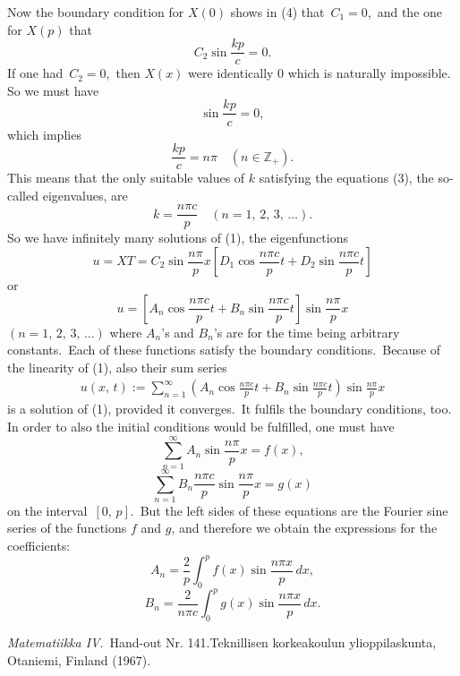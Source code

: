\documentclass[12pt]{article}
\theoremstyle{definition}
\begin{document}
Now the boundary condition for $X(0)$ shows in (4) that\, $C_1 = 0$,\, and the one for $X(p)$ that 
              $$C_2\sin\frac{kp}{c} = 0.$$
If one had\, $C_2 = 0$,\, then $X(x)$ were identically 0 which is naturally impossible.\, So we must have
               $$\sin\frac{kp}{c} = 0,$$
which implies
$$\frac{kp}{c} = n\pi \quad (n \in \mathbb{Z}_+).$$
This means that the only suitable values of $k$ satisfying the equations (3), the so-called eigenvalues, are
$$k = \frac{n\pi c}{p} \quad (n = 1,\,2,\,3,\,\ldots).$$
So we have infinitely many solutions of (1), the eigenfunctions
$$u = XT = C_2\sin\frac{n\pi}{p}x
\left[D_1\cos\frac{n\pi c}{p}t+D_2\sin\frac{n\pi c}{p}t\right]$$
or
$$u = \left[A_n\cos\frac{n\pi c}{p}t+B_n\sin\frac{n\pi c}{p}t\right]
\sin\frac{n\pi}{p}x$$
$(n = 1,\,2,\,3,\,\ldots)$ where $A_n$'s and $B_n$'s are for the time being arbitrary constants.\, Each of these functions satisfy the boundary conditions.\, Because of the linearity of (1), also their sum series 
\begin{align}
u(x,\,t) := \sum_{n=1}^\infty\left(A_n\cos\frac{n\pi c}{p}t+B_n\sin\frac{n\pi c}{p}t\right)\sin\frac{n\pi}{p}x
\end{align}
is a solution of (1), provided it converges.\, It fulfils the boundary conditions, too.\, In order to also the initial conditions would be fulfilled, one must have
$$\sum_{n=1}^\infty A_n\sin\frac{n\pi}{p}x = f(x),$$
$$\sum_{n=1}^\infty B_n\frac{n\pi c}{p}\sin\frac{n\pi}{p}x = g(x)$$
on the interval\, $[0,\,p]$.\, But the left sides of these equations are the Fourier sine series of the functions $f$ and $g$, and therefore we obtain the expressions for the coefficients:
$$A_n = \frac{2}{p}\int_{0}^p\!f(x)\sin\frac{n\pi x}{p}\,dx,$$
$$B_n = \frac{2}{n\pi c}\int_{0}^p\!g(x)\sin\frac{n\pi x}{p}\,dx.$$

\begin{thebibliography}{9}
 {\em Matematiikka IV}.\, Hand-out Nr. 141.\quad Teknillisen korkeakoulun ylioppilaskunta, Otaniemi, Finland (1967).
\end{thebibliography}
\end{document}
